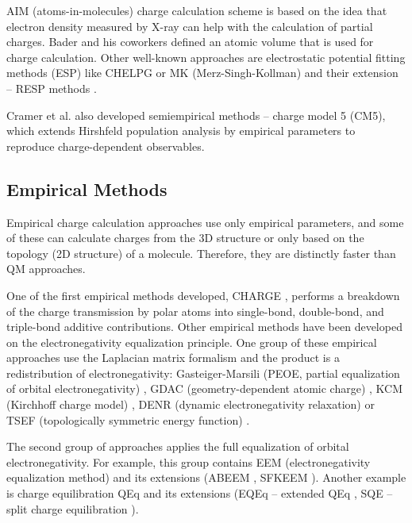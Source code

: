 AIM (atoms-in-molecules) \cite{Bader1985, Bader1991} charge calculation scheme is based on the idea that
electron density measured by X-ray can help with the calculation of partial
charges. Bader and his coworkers \cite{Bader1985, Bader1991} defined an atomic
volume that is used for charge calculation. Other well-known approaches are
electrostatic potential fitting methods (ESP) like CHELPG \cite{Breneman1990}
or MK (Merz-Singh-Kollman) \cite{Besler1990} and their extension -- RESP
methods \cite{Bayly1992}.

Cramer et al. \cite{Marenich2009} also developed semiempirical methods -- charge
model 5 (CM5), which extends Hirshfeld population analysis by empirical
parameters to reproduce charge-dependent observables. 

\subsection{Empirical Methods}

Empirical charge calculation approaches use only empirical parameters, and some of these can
calculate charges from the 3D structure or only based on the topology (2D structure)
of a molecule. Therefore, they are distinctly faster than QM approaches. 

One of the first empirical methods developed, CHARGE \cite{Abraham2004}, performs a breakdown
of the charge transmission by polar atoms into single-bond, double-bond, and 
triple-bond additive contributions. Other empirical methods have been developed
on the electronegativity equalization principle. One group of these empirical
approaches use the Laplacian matrix formalism and the product is
a redistribution of electronegativity: Gasteiger-Marsili (PEOE, partial
equalization of orbital electronegativity) \cite{Gasteiger1980},
GDAC (geometry-dependent atomic charge) \cite{Cho2001}, KCM (Kirchhoff charge
model) \cite{Oliferenko2006}, DENR (dynamic electronegativity
relaxation) \cite{Shulga2008} or TSEF (topologically symmetric energy
function) \cite{Shulga2008}.

The second group of approaches applies the full equalization of orbital
electronegativity. For example, this group contains EEM (electronegativity
equalization method) \cite{Mortier1986} and its extensions (ABEEM \cite{Yang1997},
SFKEEM \cite{Chaves2006}). Another example is charge
equilibration QEq \cite{Rappe1991} and its extensions (EQEq -- extended QEq
\cite{Wilmer2012}, SQE  -- split charge equilibration \cite{Nistor2006}).

